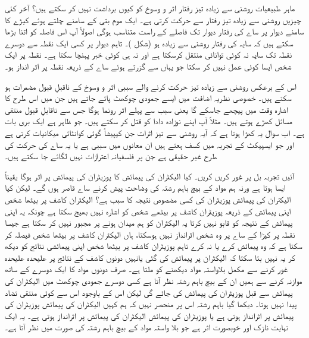 ماہر طبیعیات روشنی سے زیادہ تیز رفتار اثر و وسوخ کو کیوں برداشت نہیں کر سکتے ہیں؟ آخر کئی چیزیں روشنی سے زیادہ تیز رفتار سے حرکت کرتی ہے۔ ایک موم بتی کے سامنے چلتے ہوئے کیڑے کا سامنے دیوار پر ساے کی رفتار دیوار تک فاصلے کے راست متناسب ہوگی اصولاً آپ اس فاصلہ کو اتنا بڑھا سکتے ہیں کہ سایہ کی رفتار روشنی سے زیادہ ہو (شکل )۔ تاہم دیوار پر کسی ایک نقطہ سے دوسرے نقطہ تک سایہ نہ کوئی توانائی منتقل کرسکتا ہے اور نہ ہی کوئی خبر پہنچا سکتا ہے۔ نقطہ  پر ایک شخص ایسا کوئی عمل نہیں کر سکتا جو یہاں سے گزرتے ہوئے ساے کے ذریعہ نقطہ  پر اثر انداز ہو۔


اس کے برعکس روشنی سے زیادہ تیز حرکت کرنے والے سببی اثر و وسوخ کے ناقبلِ قبول مضمرات ہو سکتے ہیں۔ خصوصی نظریہ اضافت میں ایسے جمودی چوکھٹ پائے جاتے ہیں جن میں اس طرح کا اشارہ وقت میں پیچھے جاسکے گا یعنی سبب سے پہلے اثر رونما ہوگا جس سے ناقابلِ قبول منتقی مسائل کھڑے ہوتے ہیں۔ مثلاً آپ اپنے نوزادہ دادا کو قتل کر سکتے ہیں۔ جو ظاہر ہے ایک بری بات ہے۔ اب سوال یہ کھڑا ہوتا ہے کہ آیہ روشنی سے تیز اثرات جن کیپیشاً گوئی کوانٹائی میکانیات کرتی ہے اور جو ایسپیکٹ کے تجربہ میں کسف ہعتے ہیں ان معانوں میں سببی ہے یا یہ ساے کی حرکت کی طرح غیر حقیقی ہے جن پر فلسفیانہ اعترازات نہیں لگائے جا سکتے ہیں۔

آئیں تجربہ بل پر غور کریں کریں۔ کیا الیکٹران کی پیمائش کا پوزیٹران کی پیمائش پر اثر ہوگا  یقیناً ایسا ہوتا ہے ورنہ ہم مواد کے بیچ باہم رشتہ کی وضاحت پیش کرنے ساے قاصر ہوں گے۔ لیکن کیا الیکتران کی پیمائش پوزیٹران کی کسی مضصوص نتیجہ کا سبب ہے؟ الیکٹران کاشف پر بیٹھا شخص اپنی پیمائش کے ذریعہ پوزیٹران کاشف پر بیٹھے شخص کو اشارہ نہیں بھیج سکتا ہے چونکہ یہ اپنی پیمائش کے نتیجہ کو قابو نہیں کرتا یہ الیکٹران کو ہم میدان ہونے پر مجبور نہیں  کر سکتا ہے جیسا نقطہ  پر کیڑا کے ساے پر وہ شخص اثرانداز نہیں ہوسکتا، ہاں الیکٹران کاشف پر بیٹھا شخص فیصلہ کر سکتا ہے کہ وہ پیمائش کرے یا نہ کرے تاہم پوزیٹران کاشف پر بیٹھا شخص اپنی پیمائشی نتائج کو دیکھ کر یہ نہیں بتا سکتا کہ الیکٹران پر پیمائش کی گئی یانہیں دونوں کاشف کے نتائج پر علیحدہ علیحدہ غور کرنے سے مکمل بلاواستہ مواد دیکھنے کو ملتا ہے۔ صرف دونوں مواد کا ایک دوسرے کے ساتھ موازنہ کرنے سے ہمیں ان کے بیچ باہم رشتہ نظر آتا ہے کسی دوسرے جمودی چوکھٹ میں الیکٹران کی پیمائش سے قبل پوزیٹران کی پیمائش کی جائے گی لیکن اس کے باوجود اس سے کوئی منتقی تضاد پیدا نہیں ہوتا۔ دیکھا گیا باہم رشتہ اس پر منحصر نہیں کہ ہم کہیں الیکٹران کی پیمائش پوزیٹران کی پیمائش پر اثرانداز ہوتی ہے یا پوزیٹران کی پیمائش الیکٹران کی پیمائش پر اثرانداز ہوتی ہے۔ یہ ایک نہایت نازک اور خوبصورت اثر ہے جو بلا واستہ مواد کے بیچ باہم رشتہ کی صورت میں نظر آتا ہے۔

